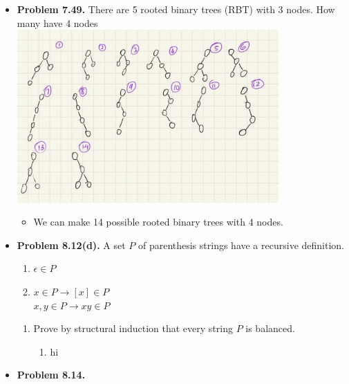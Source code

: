 \documentclass{article}
\begin{document}
\begin{itemize}
\begin{enumerate}[label=(c)]
\begin{enumerate}[label=\arabic*.]
            \end{enumerate}
        \end{enumerate}
        \item \textbf{Problem 7.49.} There are 5 rooted binary trees (RBT) with 3 nodes. How many have 4 nodes\\
        \includegraphics[width=100mm,scale=0.5]{binaryTrees.png}
        \begin{itemize}[label=$\bullet$]
            \item We can make 14 possible rooted binary trees with 4 nodes.
        \end{itemize}
        \item \textbf{Problem 8.12(d).} A set $P$ of parenthesis strings have a recursive definition.
        \begin{enumerate}[label=\arabic*.]
            \item $\epsilon \in P$
            \item $x \in P \rightarrow [x] \in P$\\
            $x,y \in P \rightarrow xy \in P$
        \end{enumerate}
        \begin{enumerate}[label=(d)]
            \item Prove by structural induction that every string $P$ is balanced.
            \begin{enumerate}[label=\roman*.]
                \item hi
            \end{enumerate}
        \end{enumerate}
        \item \textbf{Problem 8.14.}
    \end{itemize}
    
\end{document}
